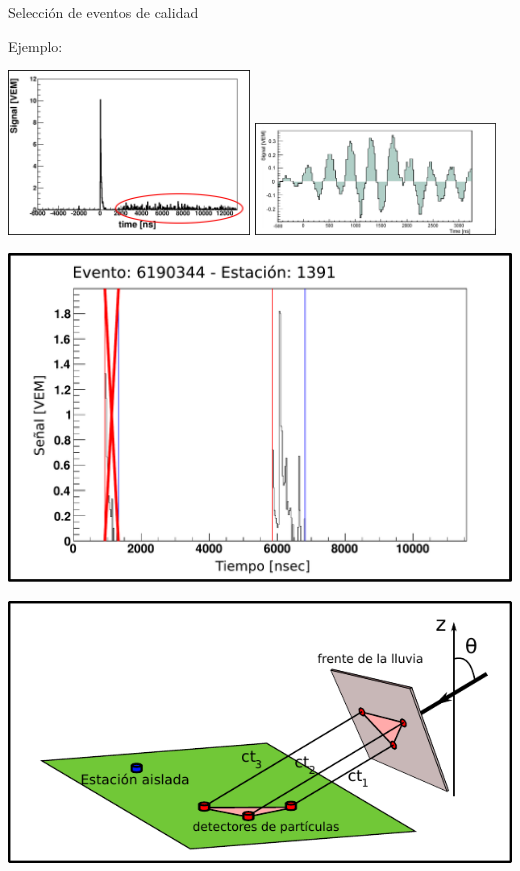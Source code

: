 \begin{frame}{Selecci\'on de eventos de calidad}
\begin{exampleblock}{Ejemplo:}
 \begin{overprint}
 \centerline{\includegraphics[width=0.48\textwidth]{fig/seleccionAuger/pmt2_border}\hspace*{2mm}
 \includegraphics[width=0.48\textwidth]{fig/seleccionAuger/lighting}}
 \centerline{\includegraphics[height=0.35\textwidth]{fig/seleccionAuger/badStartTime_2}}
 \centerline{\includegraphics[height=0.35\textwidth]{fig/seleccionAuger/geome2}}
 \end{overprint}
\end{exampleblock}
\end{frame}


